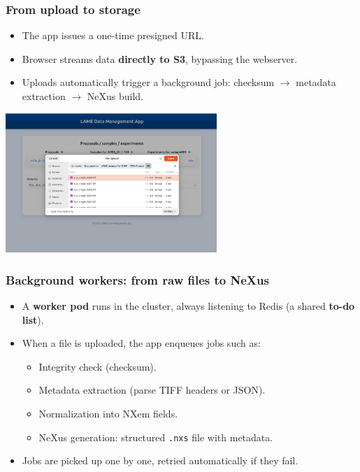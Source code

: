\documentclass{beamer}
\begin{document}
	\begin{frame}
		\frametitle{From upload to storage}
		
		\begin{itemize}
			\item The app issues a one-time presigned URL.
			\item Browser streams data \textbf{directly to S3}, bypassing the webserver.
			\item Uploads automatically trigger a background job:
			checksum $\to$ metadata extraction $\to$ NeXus build.
		\end{itemize}
		
		\vspace{1em}
		\centering
		\includegraphics[width=0.6\textwidth]{otherResources/ui_file_picker.png}
	\end{frame}
	
	\begin{frame}
		\frametitle{Background workers: from raw files to NeXus}
		
		\begin{itemize}
			\item A \textbf{worker pod} runs in the cluster, always listening to Redis (a shared \textbf{to-do list}).  
			\item When a file is uploaded, the app enqueues jobs such as:  
			\begin{itemize}
				\item Integrity check (checksum).  
				\item Metadata extraction (parse TIFF headers or JSON).  
				\item Normalization into NXem fields.  
				\item NeXus generation: structured \texttt{.nxs} file with metadata.  
			\end{itemize}
			\item Jobs are picked up one by one, retried automatically if they fail.  
		\end{itemize}
	\end{frame}
	
\end{document}
